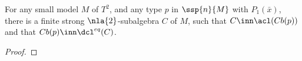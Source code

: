 \begin{teo}\label{teowei}
For any small model $M$ of $T^{2}$, and any type $p$ in $\ssp{n}{M}$ with $P_{1}(\bar x)$,
there is a finite strong $\nla{2}$-subalgebra $C$ of $M$,
such that
$C\inn\acl(Cb(p))$ and that $Cb(p)\inn\dcl^{eq}(C)$.
\end{teo}
\begin{proof}
%
%
%
%
%

\end{proof}
